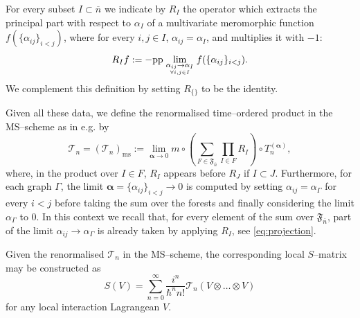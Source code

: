 \documentclass[a4paper,10pt,twoside]{article}
\numberwithin{equation}{section}
\newcounter{and}
\def\pp{\mathrm{pp}}
\def\ms{\mathrm{ms}}
\def\balpha{{\boldsymbol{\alpha}}}
\theoremstyle{plain}
\theoremstyle{definition}
\begin{document}
For every subset $I\subset \overline{n}$ we indicate by $R_I$ the operator which extracts the principal part with respect to $\alpha_I$ of a multivariate meromorphic function $f(\{\alpha_{ij}\}_{i<j})$, where for every $i,j \in I$, $\alpha_{ij}=\alpha_I$, and multiplies it with $-1$:
\begin{equation}\label{eq:projection}
R_I f := - \pp  \lim_{\scriptstyle\alpha_{ij} \to \alpha_I\atop\forall i,j\in I} f(\{\alpha_{ij}\}_{i<j}).
\end{equation}
We complement this definition by setting $R_{\{\}}$ to be the identity.

Given all these data, we define the renormalised time--ordered product in the MS--scheme as in e.g. \cite[Theorem 3.1]{dfkr} by
\begin{equation}\label{eq:forset-formula}
\mathcal{T}_n = \left(\mathcal{T}_n\right)_\ms := \lim_{\balpha \to 0}   m \circ   \left( \sum_{F\in\mathfrak{F}_{\overline{n}}} \prod_{I\in F} R_I\right)  \circ    T^{(\balpha)}_n,
\end{equation}
where, in the product over $I\in F$, $R_I$ appears before $R_J$ if $I\subset J$. 
Furthermore, for each graph $\Gamma$, the limit $\balpha=\{\alpha_{ij}\}_{i<j}\to 0$ is computed by setting $\alpha_{ij}= \alpha_\Gamma$ for every $i<j$ before taking the sum over the forests and finally considering the limit $\alpha_\Gamma$ to $0$. In this context we recall that, for every element of the sum over $\mathfrak{F}_{\overline{n}}$, part of the limit $\alpha_{ij}\to \alpha_\Gamma$ is already taken by applying $R_I$, see \eqref{eq:projection}. 

Given the renormalised $\mathcal{T}_n$ in the MS--scheme, the corresponding local $S$--matrix may be constructed as 
\[
S(V) = \sum^\infty_{n=0}\frac{i^n}{\hbar^n n!}\mathcal{T}_n(V\otimes  \dots \otimes V)
\]
for any local interaction Lagrangean $V$.
\end{document}
